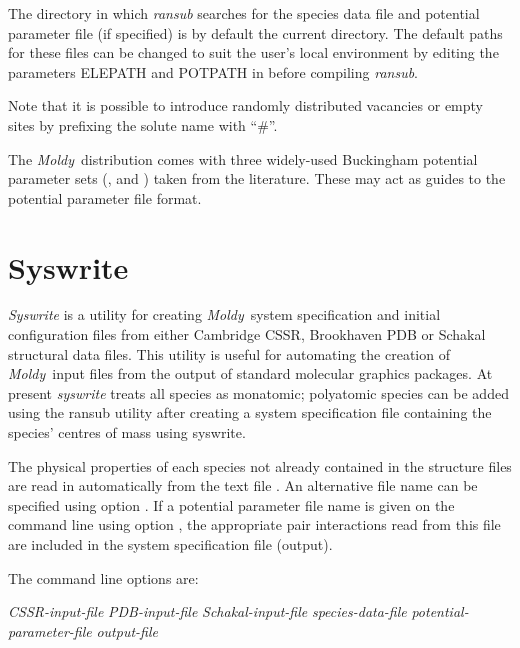 \documentclass[a4paper,twoside]{report}
\newcommand{\moldy}{\emph{Moldy}}
\begin{document}
The directory in which \emph{ransub} searches for the species data
file and potential parameter file (if specified) is by default the current
directory. The default paths for these
files can be changed to suit the user's local environment by editing the
parameters ELEPATH and POTPATH in  before compiling
\emph{ransub}.

Note that it is possible to introduce
randomly distributed vacancies or empty sites by prefixing the solute name with ``\#''.

The \moldy\ distribution comes with three widely-used Buckingham potential
parameter sets (,  and
) taken from the literature. These may act as guides
to the potential parameter file format.

\section{Syswrite}%
\emph{Syswrite} is a utility for creating \moldy\ system specification
and initial configuration files from either Cambridge CSSR, Brookhaven
PDB or Schakal structural data files. This utility is useful for
automating the creation of \moldy\ input files from the output of standard
molecular graphics packages. At present \emph{syswrite} treats all species
as monatomic; polyatomic species can be added using the ransub utility after
creating a system specification file containing the species' centres of mass
using syswrite.

The physical properties of each species not already contained in the
structure files are read in automatically from the text file
. An alternative
file name can be specified using option . If a potential
parameter file name is given on the command line using option
, the appropriate pair interactions read from this file are
included in the system specification file (output).

The command line options are:
\begin{center}
\Lit{[-g} \textit{CSSR-input-file} \Lit{|}
 \textit{PDB-input-file} \Lit{|}
 \textit{Schakal-input-file}\Lit{]}
\Lit{[-e} \textit{species-data-file}\Lit{]} 
\Lit{[-y} \textit{potential-parameter-file}\Lit{]} 
\Lit{[-o} \textit{output-file}\Lit{]}
\end{center}
\end{document}
